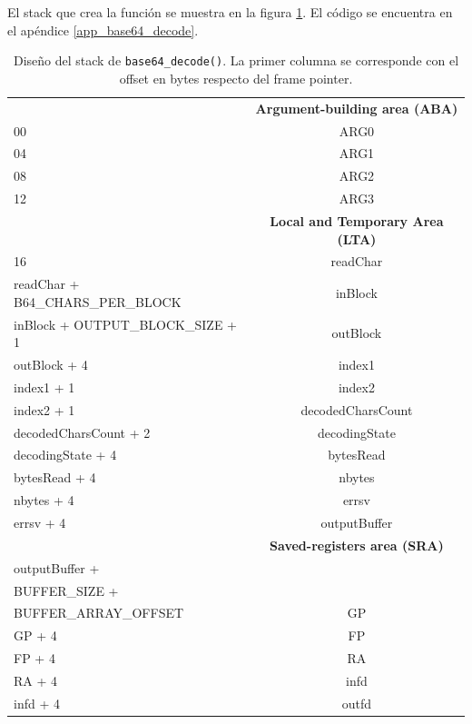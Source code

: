 El stack que crea la función se muestra en la figura \ref{stack_base64_decode}. El código se encuentra en el apéndice \ref{app_base64_decode}.
	
	\begin{table}[H]
		\centering
		\begin{tabular}{@{}l|c|@{}}
			\cmidrule(l){2-2} 
			\multicolumn{1}{c|}{\textbf{}} & \textbf{Argument-building area (ABA)} \\ \cmidrule(l){2-2} 
			00 & ARG0 \\ \cmidrule(l){2-2} 
			04 & ARG1 \\ \cmidrule(l){2-2} 
			08 & ARG2 \\ \cmidrule(l){2-2}
			12 & ARG3 \\ \cmidrule(l){2-2} 
			\multicolumn{1}{c|}{\textbf{}} & \textbf{Local and Temporary Area (LTA)} \\ \cmidrule(l){2-2} 
			16 & readChar \\ \cmidrule(l){2-2} 
			readChar + B64\_CHARS\_PER\_BLOCK & inBlock \\ \cmidrule(l){2-2} 
			inBlock + OUTPUT\_BLOCK\_SIZE + 1 & outBlock \\ \cmidrule(l){2-2} 
			outBlock + 4 & index1 \\ \cmidrule(l){2-2} 		
			index1 + 1 & index2 \\ \cmidrule(l){2-2} 		
			index2 + 1 & decodedCharsCount \\ \cmidrule(l){2-2} 		
			decodedCharsCount + 2 & decodingState \\ \cmidrule(l){2-2} 		
			decodingState + 4 & bytesRead \\ \cmidrule(l){2-2} 				 
			bytesRead + 4 & nbytes \\ \cmidrule(l){2-2} 		
			nbytes + 4 & errsv \\ \cmidrule(l){2-2} 		
			errsv + 4  & outputBuffer \\ \cmidrule(l){2-2} 			
			\multicolumn{1}{c|}{\textbf{}} & \textbf{Saved-registers area (SRA)} \\ \cmidrule(l){2-2} 
			outputBuffer +\\ BUFFER\_SIZE +\\ BUFFER\_ARRAY\_OFFSET & GP \\ \cmidrule(l){2-2} 
			GP + 4 & FP \\ \cmidrule(l){2-2} 
			FP + 4 & RA \\ \cmidrule(l){2-2} 
			RA + 4 & infd \\ \cmidrule(l){2-2} 
			infd + 4 & outfd \\ \cmidrule(l){2-2} 
		\end{tabular}
		\caption{Diseño del stack de \texttt{base64\_decode()}. La primer columna se corresponde con el offset en bytes respecto del frame pointer.}
		\label{stack_base64_decode}
	\end{table}
	
